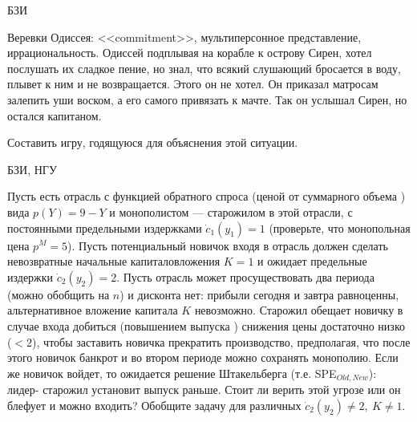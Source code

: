 \begin{problem}
\begin{source}
БЗИ
\end{source}
 {\rm Веревки Одиссея: <<commitment>>, мультиперсонное
представление, иррациональность.} Одиссей подплывая на
корабле к острову Сирен, хотел послушать их сладкое пение,
но знал, что всякий слушающий бросается в воду, плывет к
ним и не возвращается. Этого он не хотел. Он приказал
матросам залепить уши воском, а его самого привязать к
мачте. Так он услышал Сирен, но остался капитаном.

Составить  игру, годящуюся для объяснения этой ситуации.






\begin{sol}

\end{sol}
\end{problem}




\begin{problem}
\begin{source}
БЗИ, НГУ
\end{source} Пусть есть отрасль с
функцией обратного спроса (ценой от суммарного объема ) вида
$p(Y)=9-Y$ и монополистом --- старожилом в этой отрасли, с
постоянными предельными издержками $\dot{c}_1(y_1)=1$
(проверьте, что монопольная цена $p^M=5$). Пусть
потенциальный новичок входя в отрасль должен сделать
невозвратные начальные капиталовложения $K=1$ и ожидает
предельные издержки $\dot{c}_2(y_2)=2$. Пусть отрасль может
просуществовать два периода (можно обобщить на $n$) и
дисконта нет: прибыли сегодня и завтра равноценны,
альтернативное вложение капитала $K$ невозможно. Старожил
обещает новичку в случае входа добиться (повышением
выпуска ) снижения цены достаточно низко ($<2$), чтобы
заставить новичка прекратить производство, предполагая, что
после этого новичок банкрот и во втором периоде можно
сохранять монополию. Если же новичок войдет, то ожидается
решение Штакельберга (т.е. SPE$_{Old,New}$): лидер-
старожил установит выпуск раньше. Стоит ли верить этой
угрозе или он блефует и можно входить? Обобщите задачу для
различных $\dot{c}_2(y_2)\neq 2, ~K\neq 1$.






\begin{sol}

\end{sol}
\end{problem}




